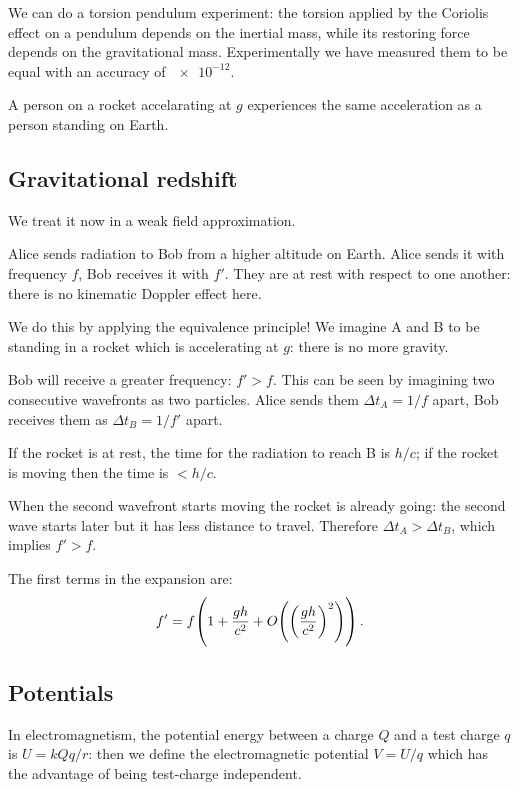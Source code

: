 \documentclass[main.tex]{subfiles}
\begin{document}
We can do a torsion pendulum experiment: the torsion applied by the Coriolis effect on a pendulum depends on the inertial mass, while its restoring force depends on the gravitational mass.
Experimentally we have measured them to be equal with an accuracy of \(\num{e-12} \).

A person on a rocket accelarating at \(g\) experiences the same acceleration as a person standing on Earth.

\subsection{Gravitational redshift}

We treat it now in a weak field approximation.


Alice sends radiation to Bob from a higher altitude on Earth. Alice sends it with frequency \(f\), Bob receives it with \(f'\). They are at rest with respect to one another: there is no kinematic Doppler effect here.

We do this by applying the equivalence principle! We imagine A and B to be standing in a rocket which is accelerating at \(g\):
there is no more gravity.

Bob will receive a greater frequency: \(f'>f\). This can be seen by imagining two consecutive wavefronts as two particles. Alice sends them \(\Delta t_A = 1/f\) apart, Bob receives them as \(\Delta t_B=1/f'\) apart.

If the rocket is at rest, the time for the radiation to reach B is \(h/c\); if the rocket is moving then the time is \(<h/c\).

When the second wavefront starts moving the rocket is already going: the second wave starts later but it has less distance to travel. Therefore \(\Delta t_A > \Delta t_B\), which implies \(f'>f\).

\begin{claim}
    The first terms in the expansion are:
    \begin{equation}
        f' = f \qty(1+ \frac{gh}{c^2} + O \qty(\qty(\frac{gh}{c^2})^2))\,.
    \end{equation}
\end{claim}
    
\subsection{Potentials}

In electromagnetism, the potential energy between a charge \(Q\) and a test charge \(q\) is \(U = k Qq/r\): then we define the electromagnetic potential \(V = U/q\) which has the advantage of being test-charge independent.
\end{document}
